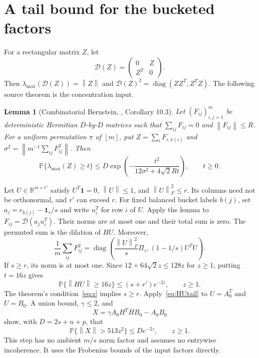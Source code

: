 \documentclass[11pt]{article}
\newtheorem{lemma}[theorem]{Lemma}
\newcommand{\R}{\mathbb R}
\newcommand{\Prob}{\mathbb P}
\newcommand{\norm}[1]{\left\lVert#1\right\rVert}
\newcommand{\diag}{\operatorname{diag}}
\newcommand{\DD}{\mathcal D}
\begin{document}
\section{A tail bound for the bucketed factors}
For a rectangular matrix $Z$, let
\[
 \DD(Z)=\begin{pmatrix}0&Z\\ Z^T&0\end{pmatrix}.
\]
Then $\lambda_{\max}(\DD(Z))=\norm Z$ and
$\DD(Z)^2=\diag(ZZ^T,Z^TZ)$.
The following source theorem is the concentration input.

\begin{lemma}[Combinatorial Bernstein, \cite{Mackey}, Corollary 10.3]
Let $(F_{ij})_{i,j=1}^m$ be deterministic Hermitian $D$-by-$D$ matrices
such that $\sum_{ij}F_{ij}=0$ and $\norm{F_{ij}}\le R$. For a uniform
permutation $\pi$ of $[m]$, put $Z=\sum_iF_{i,\pi(i)}$ and
$\sigma^2=\norm{m^{-1}\sum_{ij}F_{ij}^2}$. Then
\begin{equation}\label{eq:combBernstein}
 \Prob\{\lambda_{\max}(Z)\ge t\}
 \le D\exp\left(-\frac{t^2}{12\sigma^2+4\sqrt2 Rt}\right),\qquad t\ge0.
\end{equation}
\end{lemma}

Let $U\in\R^{m\times r'}$ satisfy $U^T\mathbf1=0$, $\norm U\le1$,
and $\norm U_F^2\le r$. Its columns need not be orthonormal, and $r'$
can exceed $r$. For fixed balanced bucket labels $b(j)$, set
$a_j=e_{b(j)}-\mathbf1_s/s$ and write $u_i^T$ for row $i$ of $U$.
Apply the lemma to $F_{ij}=\DD(a_ju_i^T)$. Their norms are at most one
and their total sum is zero. The permuted sum is the dilation of $HU$.
Moreover,
\begin{equation}\label{eq:combproxy}
 \frac1m\sum_{ij}F_{ij}^2
 =\diag\left(\frac{\norm U_F^2}{s}\Pi_s,
                   (1-1/s)U^TU\right).
\end{equation}
If $s\ge r$, its norm is at most one. Since
$12+64\sqrt2 z\le128z$ for $z\ge1$, putting $t=16z$ gives
\begin{equation}\label{eq:HUtail}
 \Prob\{\norm{HU}\ge16z\}\le(s+r')e^{-2z},\qquad z\ge1.
\end{equation}
The theorem's condition~\eqref{eq:s} implies $s\ge r$.
Apply~\eqref{eq:HUtail} to $U=A_0^T$ and $U=B_0$. A union bound,
$\gamma\le2$, and
\[
 X=\gamma A_0H^THB_0-A_0B_0
\]
show, with $D=2s+n+p$, that
\begin{equation}\label{eq:Xtail}
 \Prob\{\norm X>513z^2\}\le De^{-2z},\qquad z\ge1.
\end{equation}
This step has no ambient $m/s$ norm factor and assumes no entrywise
incoherence. It uses the Frobenius bounds of the input factors directly.
\end{document}
